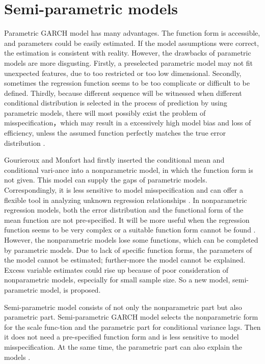 \chapter{Semi-parametric models}\label{semiparaGarch}

Parametric GARCH model has many advantages. The function form is accessible, and parameters could be easily estimated. If the model assumptions were correct, the estimation is consistent with reality. However, the drawbacks of parametric models are more disgusting. Firstly, a preselected parametric model may not fit unexpected features, due to too restricted or too low dimensional. Secondly, sometimes the regression function seems to be too complicate or difficult to be defined. Thirdly, because different sequence will be witnessed when different conditional distribution is selected in the process of prediction by using parametric models, there will most possibly exist the problem of misspecification，which may result in a excessively high model bias and loss of efficiency, unless the assumed function perfectly matches the true error distribution \citep{Di2011}.

Gourieroux and Monfort had firstly inserted the conditional mean and conditional vari-ance into a nonparametric model, in which the function form is not given. This model can supply the gaps of parametric models. Correspondingly, it is less sensitive to model misspecification and can offer a flexible tool in analyzing unknown regression relationships 
\citep{Gourieroux1992}. In nonparametric regression models, both the error distribution and the functional form of the mean function are not pre-specified. It will be more useful when the regression function seems to be very complex or a suitable function form cannot be found \citep{Eubank1993}. However, the nonparametric models lose some functions, which can be completed by parametric models. Due to lack of specific function forms, the parameters of the model cannot be estimated; further-more the model cannot be explained. Excess variable estimates could rise up because of poor consideration of nonparametric models, especially for small sample size. So a new model, semi-parametric model, is proposed.

Semi-parametric model consists of not only the nonparametric part but also parametric part. Semi-parametric GARCH model selects the nonparametric form for the scale func-tion and the parametric part for conditional variance lags. Then it does not need a pre-specified function form and is less sensitive to model misspecification. At the same time, the parametric part can also explain the models \citep{Di2011}.


